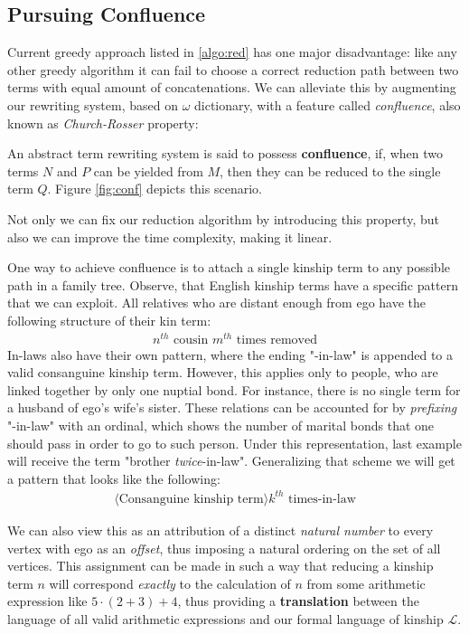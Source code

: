     \subsection{Pursuing Confluence}
    Current greedy approach listed in \ref{algo:red} has one major disadvantage: like any other greedy algorithm it can fail to choose a
    correct reduction path between two terms with equal amount of concatenations.
    We can alleviate this by augmenting our rewriting system, based on $\omega$ dictionary, with a feature called \textit{confluence},
    also known as \textit{Church-Rosser} property:
    \begin{definition}
        An abstract term rewriting system is said to possess \textbf{confluence}, if, when two terms $N$ and $P$ can be yielded from $M$,
        then they can be reduced to the single term $Q$. Figure \ref{fig:conf} depicts this scenario.
    \end{definition}
    Not only we can fix our reduction algorithm by introducing this property, but also we can improve the time complexity, making it
    linear.

    One way to achieve confluence is to attach a single kinship term to any possible path in a family tree.
    Observe, that English kinship terms have a specific pattern that we can exploit. All relatives who are distant enough from ego
    have the following structure of their kin term:
    \begin{align*}
        n^{th} \text{ cousin } m^{th} \text{ times removed}
    \end{align*}
    In-laws also have their own pattern, where the ending "-in-law" is appended to a valid consanguine kinship term. However, this
    applies only to people, who are linked together by only one nuptial bond. For instance, there is no single term for a husband of
    ego's wife's sister. These relations can be accounted for by \textit{prefixing} "-in-law" with an ordinal, which shows the number
    of marital bonds that one should pass in order to go to such person. Under this representation, last example will receive the term
    "brother
    \textit{twice}-in-law". Generalizing that scheme we will get a pattern that looks like the following:
    \begin{align*}
        \langle \text{Consanguine kinship term} \rangle k^{th} \text{ times-in-law}
    \end{align*}

    We can also view this as an attribution of a distinct \textit{natural number} to every vertex with ego as an \textit{offset}, thus
    imposing a natural ordering on the set of all vertices. This assignment can be made in such a way that reducing a kinship term $n$
    will correspond \textit{exactly} to the calculation of $n$ from some arithmetic expression like $5 \cdot (2 + 3) + 4$, thus
    providing a \textbf{translation} between the language of all valid arithmetic expressions and our formal language of kinship
    $\mathcal{L}$.

